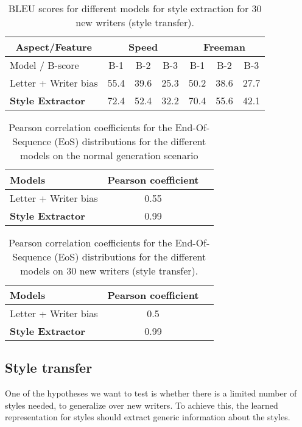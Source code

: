 \documentclass[conference]{IEEEtran}
\begin{document}
\begin{table*}[!htbp]
\centering
\begin{tabular}{|l||c|c|c||c|c|c|} 
\hline
\multicolumn{1}{|c||}{Aspect/Feature} & \multicolumn{3}{c||}{ Speed } & \multicolumn{3}{c|}{ Freeman }   \\ \hline
Model / B-score      & B-1  & B-2  & B-3           & B-1  & B-2   & B-3              \\ \hline
Letter + Writer bias & 55.4 & 39.6 & 25.3 & 50.2 & 38.6 & 27.7             \\\hline
\textbf{Style Extractor} & 72.4 & 52.4 & 32.2 & 70.4 & 55.6 & 42.1 \\\hline

\end{tabular}
\caption{BLEU scores for different models for style extraction for 30 new writers (style transfer).}
\label{table:bleu_transfer}
\end{table*}


\begin{table}[!htbp]
\centering
\begin{tabular}{|l|c|c|}
\hline
Models & Pearson coefficient\\ \hline
Letter + Writer bias & 0.55\\ \hline
\textbf{Style Extractor} & 0.99 \\ \hline
\end{tabular}
\caption{Pearson correlation coefficients for the End-Of-Sequence (EoS) distributions for the different models on the normal generation scenario}
\label{table:EoS_gen}
\end{table}


\begin{table}[!htbp]
\centering
\begin{tabular}{|l|c|c|}
\hline
Models & Pearson coefficient\\ \hline
Letter + Writer bias & 0.5\\ \hline
\textbf{Style Extractor} & 0.99\\ \hline
\end{tabular}
\caption{Pearson correlation coefficients for the End-Of-Sequence (EoS) distributions for the different models on 30 new writers (style transfer).}
\label{table:EoS_transfer}
\end{table}

\subsection{Style transfer}
\par One of the hypotheses we want to test is whether there is a limited number of styles needed, to generalize over new writers. To achieve this, the learned representation for styles should extract generic information about the styles. 
\end{document}
